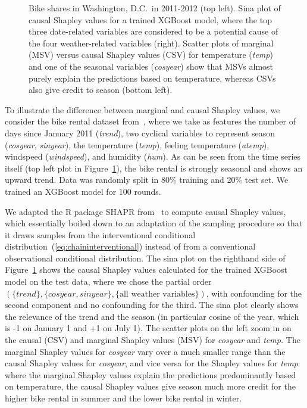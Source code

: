 \documentclass{article}
\begin{document}
\begin{figure}[t]
\begin{minipage}{.5\linewidth}
	\end{minipage}
	\caption{Bike shares in Washington, D.C.\ in 2011-2012 (top left). Sina plot of causal Shapley values for a trained XGBoost model, where the top three date-related variables are considered to be a potential cause of the four weather-related variables (right). Scatter plots of marginal (MSV) versus causal Shapley values (CSV) for temperature ({\em temp}) and one of the seasonal variables ({\em cosyear}) show that MSVs almost purely explain the predictions based on temperature, whereas CSVs also give credit to season (bottom left).}
	\label{fig:trendplot}
\end{figure}

To illustrate the difference between marginal and causal Shapley values, we consider the bike rental dataset from~\cite{fanaee2013bikerental}, where we take as features the number of days since January 2011 ({\em trend}), two cyclical variables to represent season ({\em cosyear}, {\em sinyear}), the temperature ({\em temp}), feeling temperature ({\em atemp}), windspeed ({\em windspeed}), and humidity ({\em hum}). As can be seen from the time series itself (top left plot in Figure~\ref{fig:trendplot}), the bike rental is strongly seasonal and shows an upward trend. Data was randomly split in 80\% training and 20\% test set. We trained an XGBoost model for 100 rounds. 

We adapted the R package SHAPR from~\cite{aas2019explaining} to compute causal Shapley values, which essentially boiled down to an adaptation of the sampling procedure so that it draws samples from the interventional conditional distribution~(\ref{eq:chaininterventional}) instead of from a conventional observational conditional distribution. The sina plot on the righthand side of Figure~\ref{fig:trendplot} shows the causal Shapley values calculated for the trained XGBoost model on the test data, where we chose the partial order $(\{\textit{trend}\},\{\textit{cosyear},\textit{sinyear}\},\{\textrm{all weather variables}\})$, with confounding for the second component and no confounding for the third. The sina plot clearly shows the relevance of the trend and the season (in particular cosine of the year, which is -1 on January 1 and +1 on July 1). The scatter plots on the left zoom in on the causal (CSV) and marginal Shapley values (MSV) for {\em cosyear} and {\em temp.} The marginal Shapley values for {\em cosyear} vary over a much smaller range than the causal Shapley values for {\em cosyear}, and vice versa for the Shapley values for {\em temp}: where the marginal Shapley values explain the predictions predominantly based on temperature, the causal Shapley values give season much more credit for the higher bike rental in summer and the lower bike rental in winter.
\end{document}
